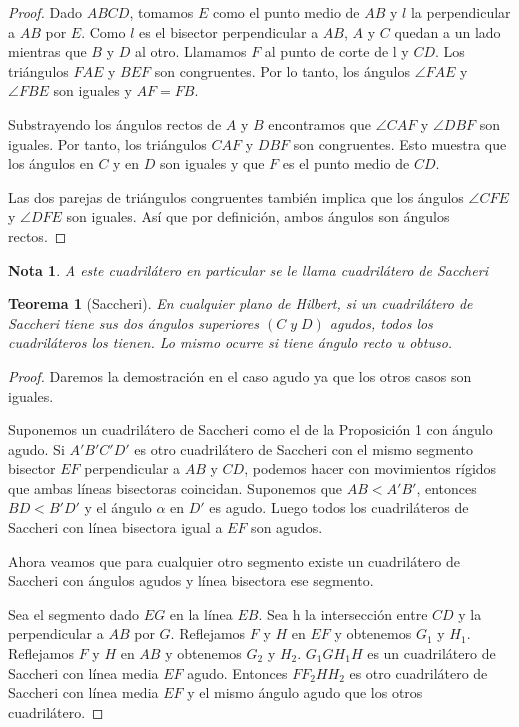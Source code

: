\documentclass[a4paper]{amsart}
\theoremstyle{plain}
\newtheorem{theorem}{Teorema}
\newtheorem{nota}{Nota}
\begin{document}
\begin{proof}
Dado  $ABCD$, tomamos $E$ como el punto medio de $AB$ y $l$ la perpendicular a $AB$ por $E$. Como $l$ es el bisector perpendicular a $AB$, $A$ y $C$ quedan a un lado mientras que $B$ y $D$ al otro. Llamamos $F$ al punto de corte de l y $CD$. Los triángulos $FAE$ y $BEF$ son congruentes. Por lo tanto, los ángulos $\angle FAE$ y $\angle FBE$ son iguales y $AF=FB$.

Substrayendo los ángulos rectos de $A$ y $B$ encontramos que $\angle CAF$ y $\angle DBF$ son iguales. Por tanto, los triángulos $CAF$ y $DBF$ son congruentes. Esto muestra que los ángulos en $C$ y en $D$ son iguales y que $F$ es el punto medio de $CD$.

Las dos parejas de triángulos congruentes también implica que los ángulos $\angle CFE$ y $\angle DFE$ son iguales. Así que por definición,  ambos ángulos son ángulos rectos.
\end{proof}

\begin{nota}
A este cuadrilátero en particular se le llama cuadrilátero de Saccheri 
\end{nota}

\begin{theorem}[Saccheri]
En cualquier plano de Hilbert, si un cuadrilátero de Saccheri tiene sus dos ángulos superiores $(C\; \textit{y}\; D)$ agudos, todos los cuadriláteros los tienen. Lo mismo ocurre si tiene ángulo recto u obtuso.
\end{theorem}

\begin{proof}
Daremos la demostración en el caso agudo ya que los otros casos son iguales.

Suponemos un cuadrilátero de Saccheri como el de la Proposición 1 con ángulo agudo. Si $A'B'C'D'$ es otro cuadrilátero de Saccheri con el mismo segmento bisector $EF$ perpendicular a $AB$ y $CD$, podemos hacer con movimientos rígidos que ambas líneas bisectoras coincidan. Suponemos que $AB<A'B'$, entonces $BD<B'D'$ y el ángulo $\alpha$ en $D'$ es agudo. Luego todos los cuadriláteros de Saccheri con línea bisectora igual a $EF$ son agudos.

Ahora veamos que para cualquier otro segmento existe un cuadrilátero de Saccheri con ángulos agudos y línea bisectora ese segmento.

Sea el segmento dado $EG$ en la línea $EB$. Sea h la intersección entre $CD$ y la perpendicular a $AB$ por $G$. Reflejamos $F$ y $H$ en $EF$ y obtenemos $G_1$ y $H_1$.  Reflejamos $F$ y $H$ en $AB$ y obtenemos $G_2$ y $H_2$. $G_1GH_1H$ es un cuadrilátero de Saccheri con línea media $EF$ agudo. Entonces $FF_2HH_2$ es otro cuadrilátero de Saccheri con línea media $EF$ y el mismo ángulo agudo que los otros cuadrilátero.
\end{proof}
\end{document}
